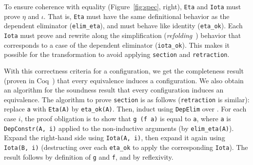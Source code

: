 
To ensure coherence with equality (Figure~\ref{fig:spec}, right),
\lstinline{Eta} and \lstinline{Iota} must prove $\eta$ and $\iota$.
That is, \lstinline{Eta} must have the same definitional behavior as the dependent eliminator (\lstinline{elim_eta}),
and must behave like identity (\lstinline{eta_ok}).
Each \lstinline{Iota} must prove and rewrite along the simplification (\textit{refolding}~\cite{boutillier:tel-01054723}) behavior that corresponds to a case of the dependent eliminator (\lstinline{iota_ok}).
This makes it possible for the transformation to
avoid applying \lstinline{section} and \lstinline{retraction}.

With this correctness criteria for a configuration, we get the completeness result (proven in Coq~) that every equivalence induces a configuration. %
We also obtain an algorithm for the soundness result that every configuration induces an equivalence.
The algorithm to prove \lstinline{section} is as follows (\lstinline{retraction} is similar):
replace \lstinline{a} with \lstinline{Eta(A)} by \lstinline{eta_ok(A)}.
Then, induct using \lstinline{DepElim} over \A.
For each case $i$, the proof obligation is to show that \lstinline{g (f a)} is equal to \lstinline{a},
where \lstinline{a} is \lstinline{DepConstr(A, i)} applied to the non-inductive arguments (by \lstinline{elim_eta(A)}).
Expand the right-hand side using \lstinline{Iota(A, i)}, then expand it again using \lstinline{Iota(B, i)}
(destructing over each \lstinline{eta_ok} to apply the corresponding \lstinline{Iota}).
The result follows by definition of \lstinline{g} and \lstinline{f}, and by reflexivity.

